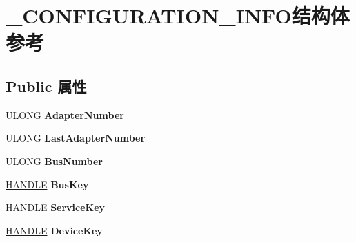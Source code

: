 \hypertarget{struct___c_o_n_f_i_g_u_r_a_t_i_o_n___i_n_f_o}{}\section{\+\_\+\+C\+O\+N\+F\+I\+G\+U\+R\+A\+T\+I\+O\+N\+\_\+\+I\+N\+F\+O结构体 参考}
\label{struct___c_o_n_f_i_g_u_r_a_t_i_o_n___i_n_f_o}
\subsection*{Public 属性}
\begin{DoxyCompactItemize}
\item 
\mbox{\label{struct___c_o_n_f_i_g_u_r_a_t_i_o_n___i_n_f_o_ac9ae569b0e7987f1e795b2b1b9f9d657}} 
U\+L\+O\+NG {\bfseries Adapter\+Number}
\item 
\mbox{\label{struct___c_o_n_f_i_g_u_r_a_t_i_o_n___i_n_f_o_a2200ac3ef2e0c5ed61a59c7554b310c2}} 
U\+L\+O\+NG {\bfseries Last\+Adapter\+Number}
\item 
\mbox{\label{struct___c_o_n_f_i_g_u_r_a_t_i_o_n___i_n_f_o_a9a695e72e20d8e4a4eee0b32c0dc9a42}} 
U\+L\+O\+NG {\bfseries Bus\+Number}
\item 
\mbox{\label{struct___c_o_n_f_i_g_u_r_a_t_i_o_n___i_n_f_o_a52067413fee634b6466d6815d5ee50d8}} 
\hyperlink{interfacevoid}{H\+A\+N\+D\+LE} {\bfseries Bus\+Key}
\item 
\mbox{\label{struct___c_o_n_f_i_g_u_r_a_t_i_o_n___i_n_f_o_ab621ff2c25855b3dc854d753a1343c69}} 
\hyperlink{interfacevoid}{H\+A\+N\+D\+LE} {\bfseries Service\+Key}
\item 
\mbox{\label{struct___c_o_n_f_i_g_u_r_a_t_i_o_n___i_n_f_o_ad67dfd7f8689a9495196093647e50ff1}} 
\hyperlink{interfacevoid}{H\+A\+N\+D\+LE} {\bfseries Device\+Key}
\item 
\mbox{\label{struct___c_o_n_f_i_g_u_r_a_t_i_o_n___i_n_f_o_a20fc191e067f71b0ed76838cf2f35de5}} 

\end{DoxyCompactItemize}
